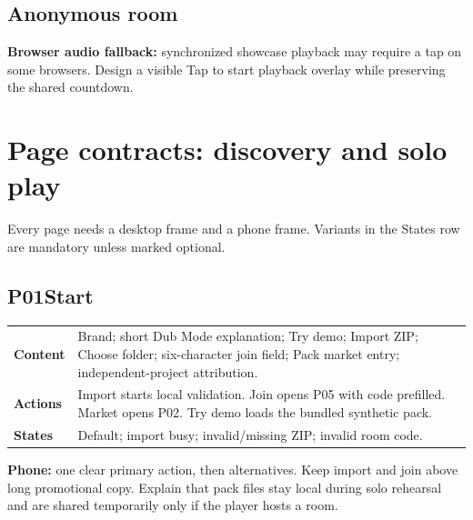\documentclass[10pt,a4paper]{article}
\makeatletter
\newcommand{\screen}[2]{\Needspace{60pt}\subsection*{\color{ink}#1\quad #2}}
\newcommand{\contract}[3]{\begin{tabularx}{\linewidth}{@{}>{\bfseries\color{teal}}p{27mm}X@{}}Content & #1\\[3pt]Actions & #2\\[3pt]States & #3\end{tabularx}}
\makeatother
\begin{document}
\subsection{Anonymous room}
\begin{center}
\end{center}
\textbf{Browser audio fallback:} synchronized showcase playback may require a tap on some browsers. Design a visible Tap to start playback overlay while preserving the shared countdown.

\clearpage
\section{Page contracts: discovery and solo play}
Every page needs a desktop frame and a phone frame. Variants in the States row are mandatory unless marked optional.

\screen{P01}{Start}
\contract{Brand; short Dub Mode explanation; Try demo; Import ZIP; Choose folder; six-character join field; Pack market entry; independent-project attribution.}{Import starts local validation. Join opens P05 with code prefilled. Market opens P02. Try demo loads the bundled synthetic pack.}{Default; import busy; invalid/missing ZIP; invalid room code.}
\textbf{Phone:} one clear primary action, then alternatives. Keep import and join above long promotional copy. Explain that pack files stay local during solo rehearsal and are shared temporarily only if the player hosts a room.
\end{document}
